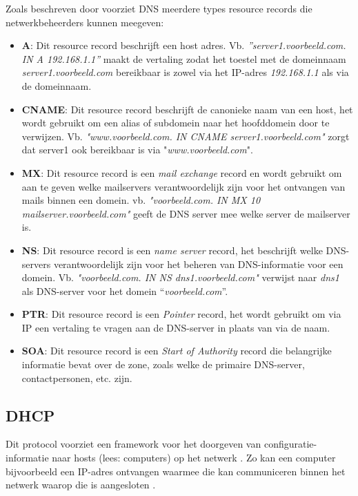 Zoals beschreven door \textcite{Mockapetris1987} voorziet DNS meerdere types resource records die netwerkbeheerders kunnen meegeven: 
\begin{itemize}
    \item \textbf{A}: Dit resource record beschrijft een host adres. 
    Vb. \textit{”server1.voorbeeld.com. IN A 192.168.1.1”} maakt de vertaling zodat het toestel met de domeinnaam \textit{server1.voorbeeld.com} bereikbaar is zowel via het IP-adres \textit{192.168.1.1} als via de domeinnaam. 
    \item \textbf{CNAME}: Dit resource record beschrijft de canonieke naam van een host, het wordt gebruikt om een alias of subdomein naar het hoofddomein door te verwijzen. Vb. \textit{"www.voorbeeld.com. IN CNAME server1.voorbeeld.com"} zorgt dat server1 ook bereikbaar is via "\textit{www.voorbeeld.com}".
    \item \textbf{MX}: Dit resource record is een \textit{mail exchange} record en wordt gebruikt om aan te geven welke mailservers verantwoordelijk zijn voor het ontvangen van mails binnen een domein. vb. \textit{"voorbeeld.com. IN MX 10 mailserver.voorbeeld.com"} geeft de DNS server mee welke server de mailserver is.
    \item \textbf{NS}: Dit resource record is een \textit{name server} record, het beschrijft welke DNS-servers verantwoordelijk zijn voor het beheren van DNS-informatie voor een domein. Vb. \textit{"voorbeeld.com. IN NS dns1.voorbeeld.com"} verwijst naar \textit{dns1} als DNS-server voor het domein “\textit{voorbeeld.com}”.
    \item \textbf{PTR}: Dit resource record is een \textit{Pointer} record, het wordt gebruikt om via IP een vertaling te vragen aan de DNS-server in plaats van via de naam.
    \item \textbf{SOA}: Dit resource record is een \textit{Start of Authority} record die belangrijke informatie bevat over de zone, zoals welke de primaire DNS-server, contactpersonen, etc. zijn.
\end{itemize}

\subsection{DHCP}
Dit protocol voorziet een framework voor het doorgeven van configuratie-informatie naar hosts (lees: computers) op het netwerk . Zo kan een computer bijvoorbeeld een IP-adres ontvangen waarmee die kan communiceren binnen het netwerk waarop die is aangesloten \autocite{Droms1997}.

